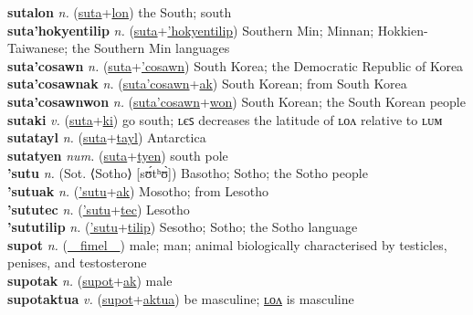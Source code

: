 \textbf{sutalon} \textit{n.} (\hyperref[suta]{suta}+\hyperref[lon]{lon})
the South; south \label{sutalon} \\
\textbf{suta'hokyentilip} \textit{n.} (\hyperref[suta]{suta}+\hyperref['hokyentilip]{'hokyentilip})
Southern Min; Minnan; Hokkien-Taiwanese; the Southern Min languages \label{suta'hokyentilip} \\
\textbf{suta'cosawn} \textit{n.} (\hyperref[suta]{suta}+\hyperref['cosawn]{'cosawn})
South Korea; the Democratic Republic of Korea \label{suta'cosawn} \\
\textbf{suta'cosawnak} \textit{n.} (\hyperref[suta'cosawn]{suta'cosawn}+\hyperref[ak]{ak})
South Korean; from South Korea \label{suta'cosawnak} \\
\textbf{suta'cosawnwon} \textit{n.} (\hyperref[suta'cosawn]{suta'cosawn}+\hyperref[won]{won})
South Korean; the South Korean people \label{suta'cosawnwon} \\
\textbf{sutaki} \textit{v.} (\hyperref[suta]{suta}+\hyperref[ki]{ki})
go south; ʟєꜱ decreases the latitude of ʟᴏᴧ relative to ʟᴜᴍ \label{sutaki} \\
\textbf{sutatayl} \textit{n.} (\hyperref[suta]{suta}+\hyperref[tayl]{tayl})
Antarctica \label{sutatayl} \\
\textbf{sutatyen} \textit{num.} (\hyperref[suta]{suta}+\hyperref[tyen]{tyen})
south pole \label{sutatyen} \\
\textbf{'sutu} \textit{n.} (Sot. ⟨Sotho⟩ [sʊ́tʰʊ̀])
Basotho; Sotho; the Sotho people \label{'sutu} \\
\textbf{'sutuak} \textit{n.} (\hyperref['sutu]{'sutu}+\hyperref[ak]{ak})
Mosotho; from Lesotho \label{'sutuak} \\
\textbf{'sututec} \textit{n.} (\hyperref['sutu]{'sutu}+\hyperref[tec]{tec})
Lesotho \label{'sututec} \\
\textbf{'sututilip} \textit{n.} (\hyperref['sutu]{'sutu}+\hyperref[tilip]{tilip})
Sesotho; Sotho; the Sotho language \label{'sututilip} \\
\textbf{supot} \textit{n.} (\hyperref[fimel]{~~fimel~~})
male; man; animal biologically characterised by testicles, penises, and testosterone \label{supot} \\
\textbf{supotak} \textit{n.} (\hyperref[supot]{supot}+\hyperref[ak]{ak})
male \label{supotak} \\
\textbf{supotaktua} \textit{v.} (\hyperref[supot]{supot}+\hyperref[aktua]{aktua})
be masculine; \hyperref[supotaktualon]{ʟᴏᴧ} is masculine \label{supotaktua} \\
